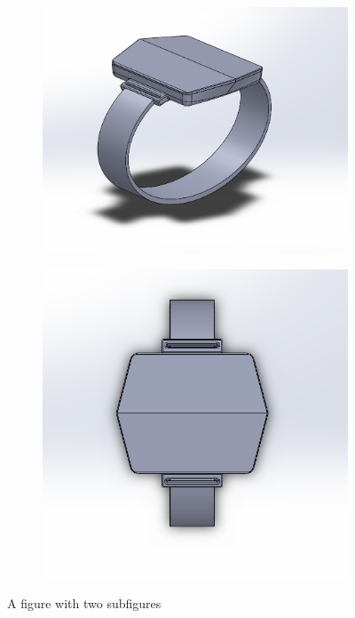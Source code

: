 \documentclass[12pt,letterpaper]{article}
\begin{document}
\begin{figure}
	\centering
	\begin{subfigure}{.5\textwidth}
		\centering
		\includegraphics[width=1\linewidth]{CaptureV1.png}
		\label{fig:sub1}
	\end{subfigure}%
	\begin{subfigure}{.5\textwidth}
		\centering
		\includegraphics[width=1\linewidth]{CaptureV4.png}
		\label{fig:sub2}
	\end{subfigure}
	\caption{A figure with two subfigures}
	\label{fig:test}
\end{figure}
\end{document}
